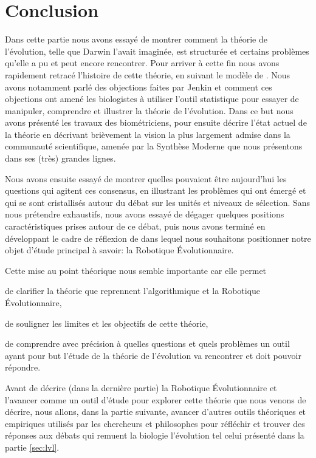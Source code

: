 \section{Conclusion}
Dans cette partie nous avons essayé de montrer comment la théorie de l'évolution, telle que Darwin l'avait imaginée, est structurée et certains problèmes qu'elle a pu et peut encore rencontrer. Pour arriver à cette fin nous avons rapidement retracé l'histoire de cette théorie, en suivant le modèle de \cite{gayon1991darwinetlapresdarwin}. Nous avons notamment parlé des objections faites par Jenkin et comment ces objections ont amené les biologistes à utiliser l'outil statistique pour essayer de manipuler, comprendre et illustrer la théorie de l'évolution. Dans ce but nous avons présenté les travaux des biométriciens, pour ensuite décrire l'état actuel de la théorie en décrivant brièvement la vision la plus largement admise dans la communauté scientifique, amenée par la Synthèse Moderne que nous présentons dans ses (très) grandes lignes.

Nous avons ensuite essayé de montrer quelles pouvaient être aujourd'hui les questions qui agitent ces consensus, en illustrant les problèmes qui ont émergé et qui se sont cristallisés autour du débat sur les unités et niveaux de sélection. Sans nous prétendre exhaustifs, nous avons essayé de dégager quelques positions caractéristiques prises autour de ce débat, puis nous avons terminé en développant le cadre de réflexion de \cite{godfrey2009darwinian} dans lequel nous souhaitons positionner notre objet d'étude principal à savoir: la Robotique \'Evolutionnaire.

Cette mise au point théorique nous semble importante car elle permet \begin{inparaenum}
\item de clarifier la théorie que reprennent l'algorithmique et la Robotique \'Evolutionnaire,
\item de souligner les limites et les objectifs de cette théorie,
\item de comprendre avec précision à quelles questions et quels problèmes un outil ayant pour but l'étude de la théorie de l'évolution va rencontrer et doit pouvoir répondre. 
\end{inparaenum}

Avant de décrire (dans la dernière partie) la Robotique \'Evolutionnaire et l'avancer comme un outil d'étude pour explorer cette théorie que nous venons de décrire, nous allons, dans la partie suivante, avancer d'autres outils théoriques et empiriques utilisés par les chercheurs et philosophes pour réfléchir et trouver des réponses aux débats qui remuent la biologie l'évolution tel celui présenté dans la partie \ref{sec:lvl}.
